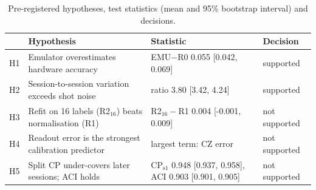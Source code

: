\begin{table}[t]
\centering
\caption{Pre-registered hypotheses, test statistics (mean and 95\% bootstrap interval) and decisions.}
\label{tab:hypotheses}
\footnotesize
\setlength{\tabcolsep}{3.5pt}
\begin{tabular}{llll}
\toprule
 & Hypothesis & Statistic & Decision \\
\midrule
H1 & Emulator overestimates hardware accuracy & EMU$-$R0 0.055 [0.042, 0.069] & supported \\
H2 & Session-to-session variation exceeds shot noise & ratio 3.80 [3.42, 4.24] & supported \\
H3 & Refit on 16 labels (R2$_{16}$) beats normalisation (R1) & R2$_{16}-$R1 0.004 [-0.001, 0.009] & not supported \\
H4 & Readout error is the strongest calibration predictor & largest term: CZ error & not supported \\
H5 & Split CP under-covers later sessions; ACI holds & CP$_{\mathrm{s1}}$ 0.948 [0.937, 0.958], ACI 0.903 [0.901, 0.905] & not supported \\
\bottomrule
\end{tabular}
\end{table}
